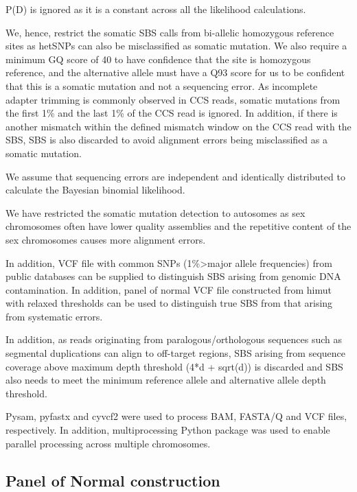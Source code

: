 P(D) is ignored as it is a constant across all the likelihood calculations. 

We, hence, restrict the somatic SBS calls from bi-allelic homozygous reference sites as hetSNPs can also be misclassified as somatic mutation. We also require a minimum GQ score of 40 to have confidence that the site is homozygous reference, and the alternative allele must have a Q93 score for us to be confident that this is a somatic mutation and not a sequencing error. As incomplete adapter trimming is commonly observed in CCS reads, somatic mutations from the first 1\% and the last 1\% of the CCS read is ignored. In addition, if there is another mismatch within the defined mismatch window on the CCS read with the SBS, SBS is also discarded to avoid alignment errors being misclassified as a somatic mutation. 

We assume that sequencing errors are independent and identically distributed to calculate the Bayesian binomial likelihood. 

We have restricted the somatic mutation detection to autosomes as sex chromosomes often have lower quality assemblies and the repetitive content of the sex chromosomes causes more alignment errors. 

In addition, VCF file with common SNPs (1\%>major allele frequencies) from public databases can be supplied to distinguish SBS arising from genomic DNA contamination. In addition, panel of normal VCF file constructed from himut with relaxed thresholds can be used to distinguish true SBS from that arising from systematic errors.  

In addition, as reads originating from paralogous/orthologous sequences such as segmental duplications can align to off-target regions, SBS arising from sequence coverage above maximum depth threshold (4*d + sqrt(d)) is discarded and SBS also needs to meet the minimum reference allele and alternative allele depth threshold. 

Pysam, pyfastx and cyvcf2 were used to process BAM, FASTA/Q and VCF files, respectively. In addition, multiprocessing Python package was used to enable parallel processing across multiple chromosomes. 

\subsection{Panel of Normal construction}


